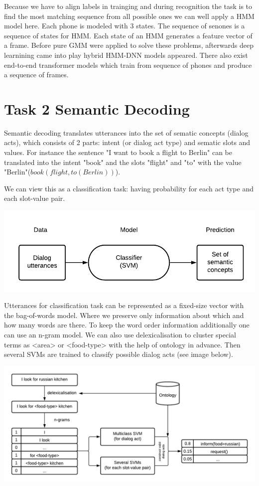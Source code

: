 \documentclass[12pt,titlepage,a4paper]{article}
\begin{document}
Because we have to align labels in trainging and during recognition the task is to find the most matching sequence from all possible ones we can well apply a HMM model here. Each phone is modeled with 3 states. The sequence of senones is a sequence of states for HMM. Each state of an HMM generates a feature vector of a frame. Before pure GMM were applied to solve these problems, afterwards deep learnining came into play hybrid HMM-DNN models appeared. There also exist end-to-end transformer models which train from sequence of phones and produce a sequence of frames.

\pagebreak
\section{Task 2 Semantic Decoding}
Semantic decoding translates utterances into the set of sematic concepts (dia\-log acts), which consists of 2 parts: intent (or dialog act type) and sematic slots and values. For instance the sentence "I want to book a flight to Berlin" can be translated into the intent "book" and the slots "flight" and "to" with the value "Berlin"($book(flight, to(Berlin))$).

We can view this as a classification task: having probability for each act type and each slot-value pair.
\begin{center}
    \includegraphics[width=\linewidth]{training-2.png}
\end{center}
Utterances for classification task can be represented as a fixed-size vector with the bag-of-words model. Where we preserve only information about which and how many words are there. To keep the word order information additionally one can use an n-gram model. We can also use delexicalisation to cluster special terms as <area> or <food-type> with the help of ontology in advance. Then several SVMs are trained to classify possible dialog acts (see image below).
\begin{center}
    \includegraphics[width=\linewidth]{semantic-decoding-classification.png}
\end{center}
\end{document}
